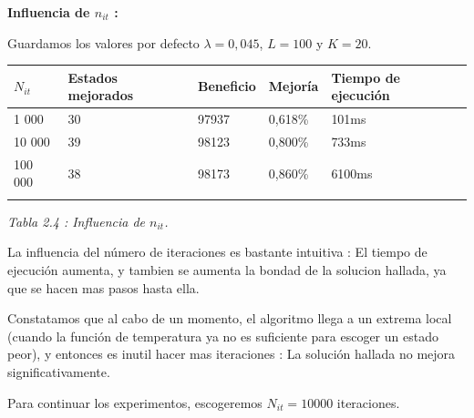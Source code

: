 \documentclass{article}
\begin{document}
\textbf{Influencia de $n_{it}$ : }

Guardamos los valores por defecto $\lambda =0,045$, $L=100$ y $K=20$.

\begin{center}
\begin{tabular}{|l||l|l|l|l|}
\hline
$N_{it}$ & Estados mejorados & Beneficio & Mejoría & Tiempo de ejecución\\
\hline
1 000 & 30 & 97937 & 0,618\% & 101ms\\
\hline
10 000 & 39 & 98123 & 0,800\% & 733ms\\
\hline
100 000 & 38 & 98173 & 0,860\% & 6100ms\\
\hline\\
\end{tabular}
{\it Tabla 2.4 : Influencia de $n_{it}$.}
\end{center}

La influencia del número de iteraciones es bastante intuitiva : El tiempo de
ejecución aumenta, y tambien se aumenta la bondad de la solucion hallada, ya que
se hacen mas pasos hasta ella.

Constatamos que al cabo de un momento, el algoritmo llega a un extrema local
(cuando la función de temperatura ya no es suficiente para escoger un estado
peor), y entonces es inutil hacer mas iteraciones : La solución hallada no
mejora significativamente.

Para continuar los experimentos, escogeremos $N_{it}=10 000$ iteraciones.\\
\end{document}
